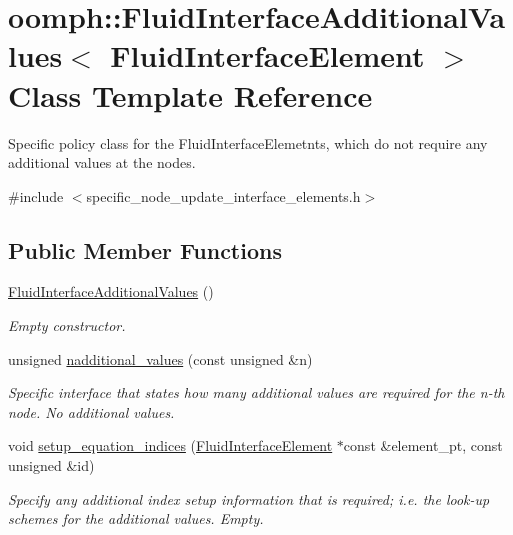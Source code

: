 \hypertarget{classoomph_1_1FluidInterfaceAdditionalValues_3_01FluidInterfaceElement_01_4}{}\section{oomph\+:\+:Fluid\+Interface\+Additional\+Values$<$ Fluid\+Interface\+Element $>$ Class Template Reference}
\label{classoomph_1_1FluidInterfaceAdditionalValues_3_01FluidInterfaceElement_01_4}


Specific policy class for the Fluid\+Interface\+Elemetnts, which do not require any additional values at the nodes.  




{\ttfamily \#include $<$specific\+\_\+node\+\_\+update\+\_\+interface\+\_\+elements.\+h$>$}

\subsection*{Public Member Functions}
\begin{DoxyCompactItemize}
\item 
\hyperlink{classoomph_1_1FluidInterfaceAdditionalValues_3_01FluidInterfaceElement_01_4_abf3371f839088990c4b9b7aef781b505}{Fluid\+Interface\+Additional\+Values} ()
\begin{DoxyCompactList}\small\item\em Empty constructor. \end{DoxyCompactList}\item 
unsigned \hyperlink{classoomph_1_1FluidInterfaceAdditionalValues_3_01FluidInterfaceElement_01_4_a810b9419626fecd85d0cc3d0d9c91a4f}{nadditional\+\_\+values} (const unsigned \&n)
\begin{DoxyCompactList}\small\item\em Specific interface that states how many additional values are required for the n-\/th node. No additional values. \end{DoxyCompactList}\item 
void \hyperlink{classoomph_1_1FluidInterfaceAdditionalValues_3_01FluidInterfaceElement_01_4_a618de69bfe64c263f1e7f44bdf864001}{setup\+\_\+equation\+\_\+indices} (\hyperlink{classoomph_1_1FluidInterfaceElement}{Fluid\+Interface\+Element} $\ast$const \&element\+\_\+pt, const unsigned \&id)
\begin{DoxyCompactList}\small\item\em Specify any additional index setup information that is required; i.\+e. the look-\/up schemes for the additional values. Empty. \end{DoxyCompactList}\end{DoxyCompactItemize}


